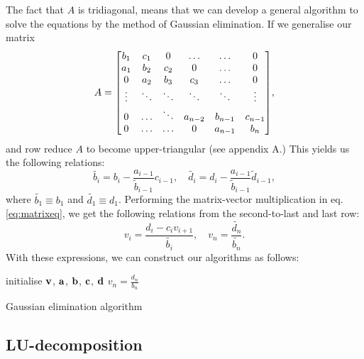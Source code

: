 The fact that $A$ is tridiagonal, means that we can develop a general algorithm
to solve the equations by the method of Gaussian elimination. If we generalise
our matrix
  \[A =
    \mqty[b_1 & c_1 & 0 & \hdots & \hdots & 0 \\
          a_1 & b_2 & c_2 & 0 & \hdots & 0 \\
          0 & a_2 & b_3 & c_3 & \hdots & 0 \\
          \vdots & \ddots & \ddots & \ddots & \ddots & \vdots \\
          0 & \hdots & \ddots & a_{n-2} & b_{n-1} & c_{n-1} \\
          0 & \hdots & \hdots & 0 & a_{n-1} & b_n],
  \]
and row reduce $A$ to become upper-triangular (see appendix A.)
This yields us the following relations:
  \begin{equation}
    \widetilde{b_i} = b_i - \frac{a_{i-1}}{\tilde{b}_{i-1}}c_{i-1}, \quad
    \widetilde{d_i} = d_i - \frac{a_{i-1}}{\tilde{b}_{i-1}}\tilde{d}_{i-1},
  \end{equation}
where $\widetilde{b_1} \equiv b_1$ and $\widetilde{d_1} \equiv d_1$.
Performing the matrix-vector multiplication in eq. \ref{eq:matrixeq}, we get
the following relations from the second-to-last and last row:
  \begin{equation}
    v_i = \frac{d_i - c_iv_{i+1}}{\widetilde{b_i}}, \quad
    v_n = \frac{\widetilde{d_n}}{\widetilde{b_n}}.
  \end{equation}
With these expressions, we can construct our algorithms as follows:
  \begin{algorithm}[htbp]
    \SetAlgoLined
    initialise $\vb{v}$, $\vb{a}$, $\vb{b}$, $\vb{c}$, $\vb{d}$\;
    $v_n = \frac{d_n}{b_n}$\;
    \caption{Gaussian elimination algorithm}
  \end{algorithm}


\subsection{LU-decomposition}
\label{sec:LU}
